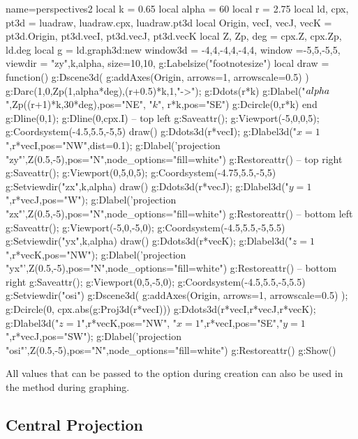 \begin{center}
\begin{luadraw}{name=perspectives2}
local k = 0.65
local alpha = 60
local r = 2.75
local ld, cpx, pt3d = luadraw, luadraw.cpx, luadraw.pt3d
local Origin, vecI, vecJ, vecK = pt3d.Origin, pt3d.vecI, pt3d.vecJ, pt3d.vecK 
local Z, Zp, deg = cpx.Z, cpx.Zp, ld.deg
local g = ld.graph3d:new{
    window3d = {-4,4,-4,4,-4,4},
    window ={-5,5,-5,5},
    viewdir = {"zy",k,alpha},
    size={10,10},
}
g:Labelsize("footnotesize")
local draw = function()
    g:Dscene3d( g:addAxes(Origin, {arrows=1, arrowscale=0.5}) )
    g:Darc(1,0,Zp(1,alpha*deg),(r+0.5)*k,1,"->"); g:Ddots(r*k)
    g:Dlabel("$\\alpha$",Zp((r+1)*k,30*deg),{pos="NE"}, "$k$", r*k,{pos="SE"})
    g:Dcircle(0,r*k)
end
g:Dline(0,1); g:Dline(0,cpx.I)
-- top left
g:Saveattr(); g:Viewport(-5,0,0,5); g:Coordsystem(-4.5,5.5,-5,5)
draw()
g:Ddots3d(r*vecI); g:Dlabel3d("$x=1$",r*vecI,{pos="NW",dist=0.1}); 
g:Dlabel('projection "zy"',Z(0.5,-5),{pos="N",node_options="fill=white"})
g:Restoreattr()
-- top right
g:Saveattr(); g:Viewport(0,5,0,5); g:Coordsystem(-4.75,5.5,-5,5)
g:Setviewdir({"zx",k,alpha})
draw()
g:Ddots3d(r*vecJ); g:Dlabel3d("$y=1$",r*vecJ,{pos="W"}); 
g:Dlabel('projection "zx"',Z(0.5,-5),{pos="N",node_options="fill=white"})
g:Restoreattr()
-- bottom left
g:Saveattr(); g:Viewport(-5,0,-5,0); g:Coordsystem(-4.5,5.5,-5,5.5)
g:Setviewdir({"yx",k,alpha})
draw()
g:Ddots3d(r*vecK); g:Dlabel3d("$z=1$",r*vecK,{pos="NW"}); 
g:Dlabel('projection "yx"',Z(0.5,-5),{pos="N",node_options="fill=white"})
g:Restoreattr()
-- bottom right
g:Saveattr(); g:Viewport(0,5,-5,0); g:Coordsystem(-4.5,5.5,-5,5.5)
g:Setviewdir("osi")
g:Dscene3d( g:addAxes(Origin, {arrows=1, arrowscale=0.5}) ); g:Dcircle(0, cpx.abs(g:Proj3d(r*vecI)))
g:Ddots3d({r*vecI,r*vecJ,r*vecK}); 
g:Dlabel3d("$z=1$",r*vecK,{pos="NW"}, "$x=1$",r*vecI,{pos="SE"},"$y=1$",r*vecJ,{pos="SW"});
g:Dlabel('projection "osi"',Z(0.5,-5),{pos="N",node_options="fill=white"})
g:Restoreattr()
g:Show()
\end{luadraw}
\end{center}

All values ​​that can be passed to the  option during creation can also be used in the  method during graphing.


\subsection{Central Projection}

